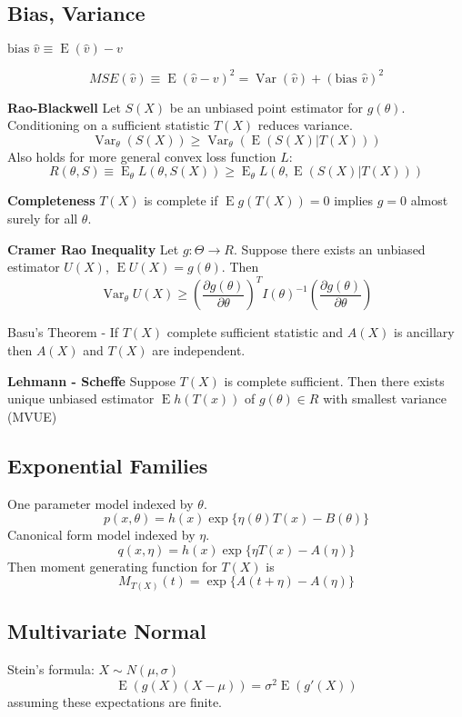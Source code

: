 \documentclass[10pt, twocolumn]{article}
\newcommand{\Expect}{\operatorname{E}}
\newcommand{\Var}{\operatorname{Var}}
\begin{document}
\subsection{Bias, Variance}

$\text{bias } \hat{v} \equiv \Expect (\hat{v}) - v$

\[
    MSE(\hat{v}) \equiv \Expect (\hat{v} - v)^2 
    = \Var (\hat{v}) + (\text{bias } \hat{v})^2
\]

\textbf{Rao-Blackwell} Let $S(X)$ be an unbiased point estimator for
$g(\theta)$. Conditioning on a sufficient statistic $T(X)$ reduces
variance.
\[
    \Var_{\theta} (S(X)) \geq \Var_{\theta} (\Expect (S(X) | T(X)))
\]
Also holds for more general convex loss function $L$:
\[
    R(\theta, S) \equiv \Expect_{\theta} L(\theta, S(X)) \geq
    \Expect_{\theta} L(\theta, \Expect( S(X) | T(X)))
\]

\textbf{Completeness} $T(X)$ is complete if $\Expect g(T(X)) = 0$ 
implies $g = 0$ almost surely for all $\theta$.

\textbf{Cramer Rao Inequality} Let $g: \Theta \rightarrow R$. Suppose there
exists an unbiased estimator $U(X)$, $\Expect U(X) = g(\theta)$. Then
\[
    \Var_\theta U(X) \geq 
    \left( \frac{\partial g(\theta)}{\partial \theta} \right)^T
    I(\theta)^{-1}
    \left( \frac{\partial g(\theta)}{\partial \theta} \right)
\]

Basu's Theorem - If $T(X)$ complete sufficient statistic and $A(X)$ is 
ancillary then $A(X)$ and $T(X)$ are independent.

\textbf{Lehmann - Scheffe} Suppose $T(X)$ is complete sufficient. Then
there exists unique unbiased estimator $\Expect h(T(x))$ of $g(\theta) \in
R$ with smallest variance (MVUE)

\subsection{Exponential Families}
One parameter model indexed by $\theta$.
\[
    p(x, \theta) = h(x) \exp \{ \eta(\theta) T(x) - B(\theta) \}
\]
Canonical form model indexed by $\eta$.
\[
    q(x, \eta) = h(x) \exp \{ \eta T(x) - A(\eta) \}
\]
Then moment generating function for $T(X)$ is
\[
    M_{T(X)}(t) = \exp \{A(t + \eta) - A(\eta) \}
\]

\subsection{Multivariate Normal}

Stein's formula: $X \sim N(\mu, \sigma)$
\[
    \Expect (g(X) (X - \mu)) = \sigma^2 \Expect(g'(X))
\]
assuming these expectations are finite.
\end{document}
